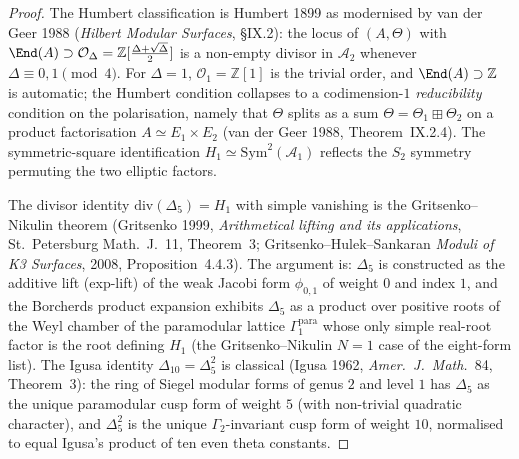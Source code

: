 \begin{proof}
The Humbert classification is Humbert 1899 as modernised by van der
Geer 1988 (\emph{Hilbert Modular Surfaces}, \S IX.2): the locus of
$(A, \Theta)$ with $\End(A) \supset \mathcal O_{\Delta} = \mathbb Z[\frac{\Delta + \sqrt\Delta}{2}]$
is a non-empty divisor in $\mathcal A_2$ whenever $\Delta \equiv 0, 1
\pmod 4$. For $\Delta = 1$, $\mathcal O_1 = \mathbb Z[1]$ is the
trivial order, and $\End(A) \supset \mathbb Z$ is automatic; the
Humbert condition collapses to a codimension-$1$ \emph{reducibility}
condition on the polarisation, namely that $\Theta$ splits as a sum
$\Theta = \Theta_1 \boxplus \Theta_2$ on a product factorisation
$A \simeq E_1 \times E_2$ (van der Geer 1988, Theorem~IX.2.4). The
symmetric-square identification $H_1 \simeq \mathrm{Sym}^2(\mathcal A_1)$
reflects the $S_2$ symmetry permuting the two elliptic factors.

The divisor identity $\mathrm{div}(\Delta_5) = H_1$ with simple
vanishing is the Gritsenko--Nikulin theorem (Gritsenko 1999,
\emph{Arithmetical lifting and its applications}, St.~Petersburg
Math.~J.~11, Theorem~3; Gritsenko--Hulek--Sankaran \emph{Moduli of K3
Surfaces}, 2008, Proposition~4.4.3). The argument is: $\Delta_5$ is
constructed as the additive lift (exp-lift) of the weak Jacobi form
$\phi_{0, 1}$ of weight $0$ and index $1$, and the Borcherds product
expansion exhibits $\Delta_5$ as a product over positive roots of the
Weyl chamber of the paramodular lattice $\Gamma^{\mathrm{para}}_1$
whose only simple real-root factor is the root defining $H_1$ (the
Gritsenko--Nikulin $N = 1$ case of the eight-form list). The Igusa
identity $\Delta_{10} = \Delta_5^2$ is classical (Igusa 1962,
\emph{Amer.\ J.\ Math.}~84, Theorem~3): the ring of Siegel modular
forms of genus $2$ and level $1$ has $\Delta_5$ as the unique
paramodular cusp form of weight $5$ (with non-trivial quadratic
character), and $\Delta_5^2$ is the unique $\Gamma_2$-invariant
cusp form of weight $10$, normalised to equal Igusa's product of ten
even theta constants.


\end{proof}
